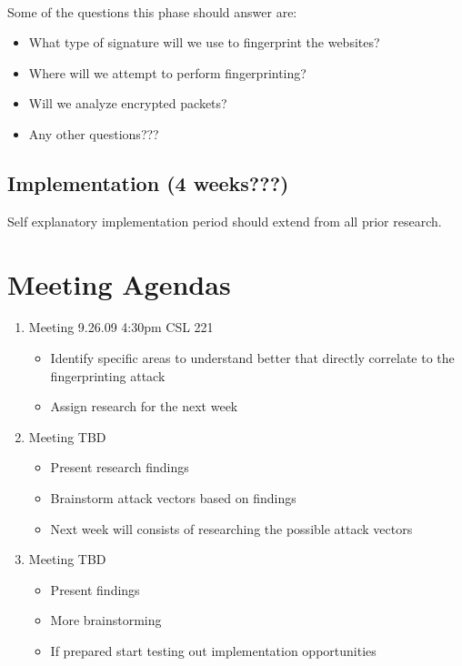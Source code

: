 \documentclass[10pt]{article}
\begin{document}
\paragraph{}Some of the questions this phase should answer are: 
\begin{itemize}
	\item What type of signature will we use to fingerprint the websites?  
	\item Where will we attempt to perform fingerprinting?
	\item Will we analyze encrypted packets? 
	\item Any other questions???
\end{itemize}

\subsection{Implementation (4 weeks???)}
Self explanatory implementation period should extend from all prior research.

\section{Meeting Agendas}
\begin{enumerate}
	\item Meeting 9.26.09 4:30pm CSL 221
		\begin{itemize} 
			\item Identify specific areas to understand better that directly 
				correlate to the fingerprinting attack 
			\item Assign research for the next week
		\end{itemize}
	\item Meeting TBD
		\begin{itemize}
			\item Present research findings
			\item Brainstorm attack vectors based on findings
			\item Next week will consists of researching the possible
				attack vectors
		\end{itemize}
	\item Meeting TBD
		\begin{itemize}
			\item Present findings
			\item More brainstorming
			\item If prepared start testing out implementation opportunities
		\end{itemize}
\end{enumerate}
\end{document}
